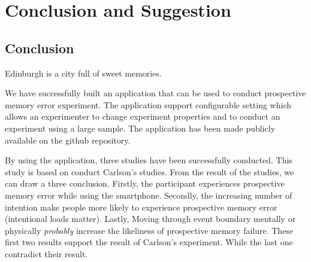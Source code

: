 \chapter{Conclusion and Suggestion}
\section{Conclusion}
\epigraph{Edinburgh is a city full of sweet memories.}{\textit{}}



We have successfully built an application that can be used to conduct prospective memory error experiment.
The application support configurable setting which allows an experimenter to change experiment properties and to conduct
an experiment using a large sample. The application has been made publicly available on the github repository.

By using the application, three studies have been successfully conducted.
This study is based on conduct Carlson's studies. From the result of the studies,
we can draw a three conclusion. Firstly, the participant experiences prospective memory error while using the smartphone.
Secondly, the increasing number of intention make people more likely to experience prospective memory error (intentional loads matter).
Lastly, Moving through event boundary mentally or physically \textit{probably} increase the likeliness of prospective memory failure.
These first two results support the result of Carlson's experiment. While the last one
contradict their result.

